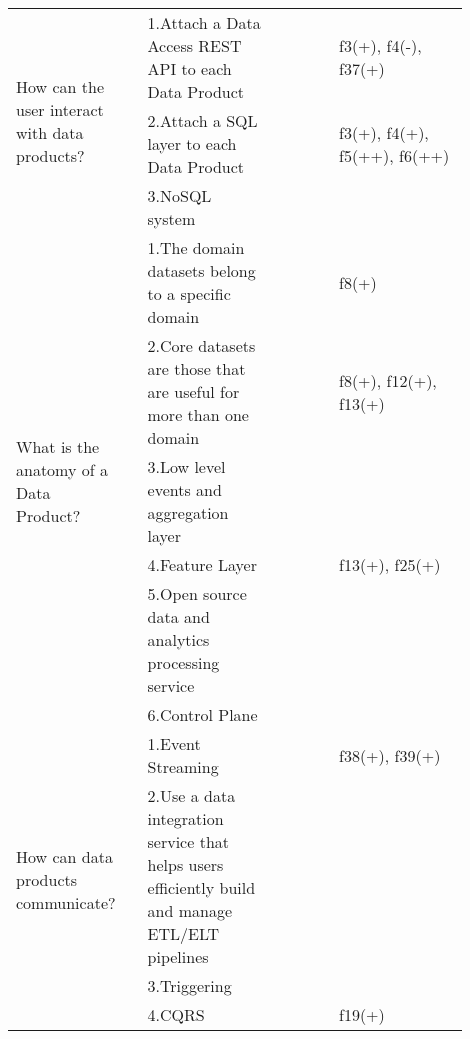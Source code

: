 \begin{tabular}{|p{0.12\linewidth}|p{0.015\linewidth}|p{0.3\linewidth}|p{0.15\linewidth}|p{0.31\linewidth}|}
\multirow{3}{\linewidth}{How can the user interact with data products?} &\cellcolor{emerald_shape_6}{} &1.Attach a Data Access REST API to each Data Product&\cellcolor{emerald_shape_7}{s2, s3, s5, s6, s7, s8, s9, s15, s17, s18, s20, s30, s32, s33, s34, s36, s37, s38, s39, s41, s45, s49, s52} & f3(+), f4(-), f37(+)\\
 & \cellcolor{emerald_shape_6}{} & 2.Attach a SQL layer to each Data Product&\cellcolor{emerald_shape_6}{s2, s3, s5, s7, s10, s13, s14, s15, s16, s27, s30, s31, s32, s36, s37, s38, s39, s43, s48, s49} & f3(+), f4(+), f5(++), f6(++)\\
 & \multirow{-3}{\linewidth}{ \cellcolor{emerald_shape_6}{32}} &3.NoSQL system&\cellcolor{emerald_shape_1}{s15} & \\
\multirow{6}{\linewidth}{What is the anatomy of a Data Product?} &\cellcolor{emerald_shape_4}{} &1.The domain datasets belong to a specific domain&\cellcolor{emerald_shape_4}{s3, s5, s7, s20, s45} & f8(+)\\
 & \cellcolor{emerald_shape_4}{} & 2.Core datasets are those that are useful for more than one domain&\cellcolor{emerald_shape_4}{s3, s5, s7, s9, s45} & f8(+), f12(+), f13(+)\\
 & \cellcolor{emerald_shape_4}{} & 3.Low level events and aggregation layer&\cellcolor{emerald_shape_4}{s3, s8, s26, s43} & \\
 & \cellcolor{emerald_shape_4}{} & 4.Feature Layer&\cellcolor{emerald_shape_4}{s9, s20, s27, s40} & f13(+), f25(+)\\
 & \cellcolor{emerald_shape_4}{} & 5.Open source data and analytics processing service&\cellcolor{emerald_shape_3}{s32, s39} & \\
 & \multirow{-6}{\linewidth}{ \cellcolor{emerald_shape_4}{15}} &6.Control Plane&\cellcolor{emerald_shape_3}{s49, s52} & \\
\multirow{10}{\linewidth}{How can data products communicate?} &\cellcolor{emerald_shape_6}{} &1.Event Streaming&\cellcolor{emerald_shape_5}{s4, s9, s17, s20, s33, s34, s38, s41, s44, s45, s48, s51, s52, s53} & f38(+), f39(+)\\
 & \cellcolor{emerald_shape_6}{} & 2.Use a data integration service that helps users efficiently build and manage ETL/ELT pipelines&\cellcolor{emerald_shape_3}{s4, s5, s30} & \\
 & \cellcolor{emerald_shape_6}{} & 3.Triggering&\cellcolor{emerald_shape_4}{s8, s10, s19, s22, s32, s33, s35, s38, s45} & \\
 & \cellcolor{emerald_shape_6}{} & 4.CQRS&\cellcolor{emerald_shape_3}{s8, s41, s43} & f19(+)\\

\end{tabular}
